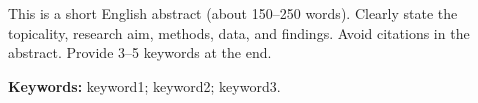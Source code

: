 This is a short English abstract (about 150–250 words). Clearly state the topicality, research aim, methods, data, and findings. Avoid citations in the abstract. Provide 3–5 keywords at the end.

\noindent\textbf{Keywords:} keyword1; keyword2; keyword3.
